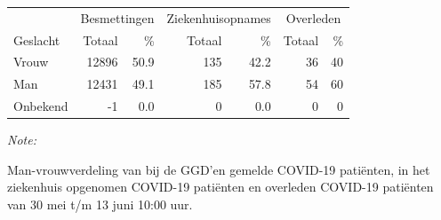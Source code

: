 \documentclass[
  english,
  man,floatsintext]{apa6}
\begin{document}
\begin{table}
\centering\begingroup\fontsize{11}{13}\selectfont

\begin{threeparttable}
\begin{tabular}{lrrrrrr}
\toprule
\multicolumn{1}{c}{ } & \multicolumn{2}{c}{Besmettingen} & \multicolumn{2}{c}{Ziekenhuisopnames} & \multicolumn{2}{c}{Overleden} \\
\cmidrule(l{3pt}r{3pt}){2-3} \cmidrule(l{3pt}r{3pt}){4-5} \cmidrule(l{3pt}r{3pt}){6-7}
Geslacht & Totaal & \% & Totaal & \% & Totaal & \%\\
\midrule
Vrouw & 12896 & 50.9 & 135 & 42.2 & 36 & 40\\
Man & 12431 & 49.1 & 185 & 57.8 & 54 & 60\\
Onbekend & -1 & 0.0 & 0 & 0.0 & 0 & 0\\
\bottomrule
\end{tabular}
\begin{tablenotes}
\item \textit{Note: } 
\item Man-vrouwverdeling van bij de GGD’en gemelde COVID-19 patiënten, in het ziekenhuis opgenomen COVID-19 patiënten en overleden COVID-19 patiënten van 30 mei t/m 13 juni 10:00 uur.
\end{tablenotes}
\end{threeparttable}
\endgroup{}
\end{table}
\newpage
\end{document}
